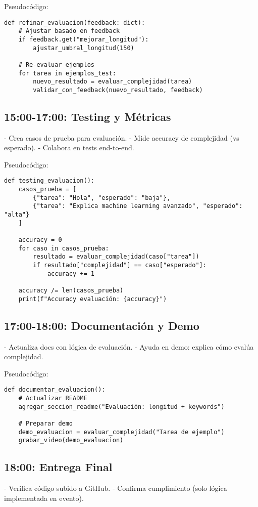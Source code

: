 \documentclass{article}
\begin{document}
Pseudocódigo:
\begin{lstlisting}
def refinar_evaluacion(feedback: dict):
    # Ajustar basado en feedback
    if feedback.get("mejorar_longitud"):
        ajustar_umbral_longitud(150)
    
    # Re-evaluar ejemplos
    for tarea in ejemplos_test:
        nuevo_resultado = evaluar_complejidad(tarea)
        validar_con_feedback(nuevo_resultado, feedback)
\end{lstlisting}

\subsection{15:00-17:00: Testing y Métricas}
- Crea casos de prueba para evaluación.
- Mide accuracy de complejidad (vs esperado).
- Colabora en tests end-to-end.

Pseudocódigo:
\begin{lstlisting}
def testing_evaluacion():
    casos_prueba = [
        {"tarea": "Hola", "esperado": "baja"},
        {"tarea": "Explica machine learning avanzado", "esperado": "alta"}
    ]
    
    accuracy = 0
    for caso in casos_prueba:
        resultado = evaluar_complejidad(caso["tarea"])
        if resultado["complejidad"] == caso["esperado"]:
            accuracy += 1
    
    accuracy /= len(casos_prueba)
    print(f"Accuracy evaluación: {accuracy}")
\end{lstlisting}

\subsection{17:00-18:00: Documentación y Demo}
- Actualiza docs con lógica de evaluación.
- Ayuda en demo: explica cómo evalúa complejidad.

Pseudocódigo:
\begin{lstlisting}
def documentar_evaluacion():
    # Actualizar README
    agregar_seccion_readme("Evaluación: longitud + keywords")
    
    # Preparar demo
    demo_evaluacion = evaluar_complejidad("Tarea de ejemplo")
    grabar_video(demo_evaluacion)
\end{lstlisting}

\subsection{18:00: Entrega Final}
- Verifica código subido a GitHub.
- Confirma cumplimiento (solo lógica implementada en evento).
\end{document}
